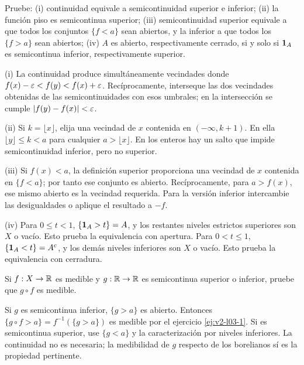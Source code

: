 \begin{ejercicio}\label{ej:v2-l03-4}
Pruebe: (i) continuidad equivale a semicontinuidad superior e inferior; (ii) la función piso es semicontinua superior; (iii) semicontinuidad superior equivale a que todos los conjuntos $\{f<a\}$ sean abiertos, y la inferior a que todos los $\{f>a\}$ sean abiertos; (iv) $A$ es abierto, respectivamente cerrado, si y solo si $\mathbf1_{A}$ es semicontinua inferior, respectivamente superior.
\end{ejercicio}
\begin{solucion}
(i) La continuidad produce simultáneamente vecindades donde $f(x)-\varepsilon<f(y)<f(x)+\varepsilon$. Recíprocamente, interseque las dos vecindades obtenidas de las semicontinuidades con esos umbrales; en la intersección se cumple $|f(y)-f(x)|<\varepsilon$.

(ii) Si $k=\lfloor x\rfloor$, elija una vecindad de $x$ contenida en $(-\infty,k+1)$. En ella $\lfloor y\rfloor\le k<a$ para cualquier $a>\lfloor x\rfloor$. En los enteros hay un salto que impide semicontinuidad inferior, pero no superior.

(iii) Si $f(x)<a$, la definición superior proporciona una vecindad de $x$ contenida en $\{f<a\}$; por tanto ese conjunto es abierto. Recíprocamente, para $a>f(x)$, ese mismo abierto es la vecindad requerida. Para la versión inferior intercambie las desigualdades o aplique el resultado a $-f$.

(iv) Para $0\le t<1$, $\{\mathbf1_{A}>t\}=A$, y los restantes niveles estrictos superiores son $X$ o vacío. Esto prueba la equivalencia con apertura. Para $0<t\le1$, $\{\mathbf1_{A}<t\}=A^c$, y los demás niveles inferiores son $X$ o vacío. Esto prueba la equivalencia con cerradura.
\end{solucion}

\begin{ejercicio}\label{ej:v2-l03-5}
Si $f:X\to\mathbb R$ es medible y $g:\mathbb R\to\mathbb R$ es semicontinua superior o inferior, pruebe que $g\circ f$ es medible.
\end{ejercicio}
\begin{solucion}
Si $g$ es semicontinua inferior, $\{g>a\}$ es abierto. Entonces $\{g\circ f>a\}=f^{-1}(\{g>a\})$ es medible por el ejercicio \ref{ej:v2-l03-1}. Si es semicontinua superior, use $\{g<a\}$ y la caracterización por niveles inferiores. La continuidad no es necesaria; la medibilidad de $g$ respecto de los borelianos sí es la propiedad pertinente.
\end{solucion}

